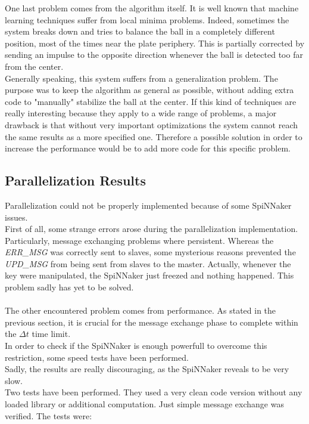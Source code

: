 \documentclass{article}
\begin{document}
One last problem comes from the algorithm itself. It is well known that machine learning techniques suffer from local minima problems. Indeed, sometimes the system breaks down and tries to balance the ball in a completely different position, most of the times near the plate periphery. This is partially corrected by sending an impulse to the opposite direction whenever the ball is detected too far from the center.\\

Generally speaking, this system suffers from a generalization problem. The purpose was to keep the algorithm as general as possible, without adding extra code to "manually" stabilize the ball at the center. If this kind of techniques are really interesting because they apply to a wide range of problems, a major drawback is that without very important optimizations the system cannot reach the same results as a more specified one. Therefore a possible solution in order to increase the performance would be to add more code for this specific problem.\\


\subsection{Parallelization Results}
Parallelization could not be properly implemented because of some SpiNNaker issues.\\

First of all, some strange errors arose during the parallelization implementation. Particularly, message exchanging problems where persistent. Whereas the \textit{ERR\_MSG} was correctly sent to slaves, some mysterious reasons prevented the \textit{UPD\_MSG} from being sent from slaves to the master. Actually, whenever the key were manipulated, the SpiNNaker just freezed and nothing happened. This problem sadly has yet to be solved.\\ \\

The other encountered problem comes from performance. As stated in the previous section, it is crucial for the message exchange phase to complete within the \(\Delta t\) time limit. \\
In order to check if the SpiNNaker is enough powerfull to overcome this restriction, some speed tests have been performed. \\
Sadly, the results are really discouraging, as the SpiNNaker reveals to be very slow. \\
Two tests have been performed. They used a very clean code version without any loaded library or additional computation. Just simple message exchange was verified. The tests were:
\end{document}
